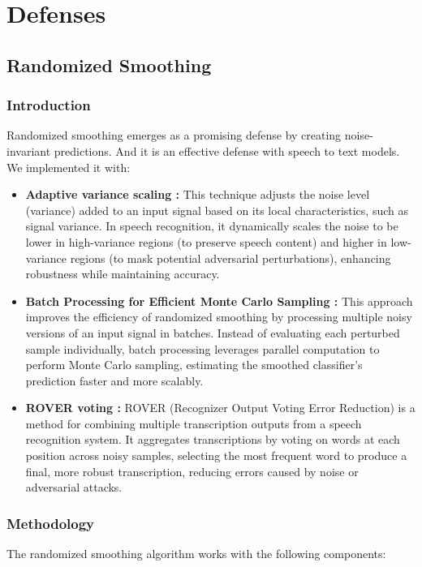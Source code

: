 \documentclass[../main.tex]{subfiles}
\begin{document}
\section{Defenses}
\subsection{Randomized Smoothing}
\subsubsection{Introduction}
Randomized smoothing \cite{cohen2019certified} emerges as a promising defense by creating noise-invariant predictions. And it is an effective defense with speech to text models\cite{zelasko2021adversarial}. We implemented it with:

\begin{itemize}
    \item \textbf{Adaptive variance scaling \cite{li2024adaptive}:} This technique adjusts the noise level (variance) added to an input signal based on its local characteristics, such as signal variance. In speech recognition, it dynamically scales the noise to be lower in high-variance regions (to preserve speech content) and higher in low-variance regions (to mask potential adversarial perturbations), enhancing robustness while maintaining accuracy.
    \item \textbf{Batch Processing for Efficient Monte Carlo Sampling \cite{cohen2019certified}:} This approach improves the efficiency of randomized smoothing by processing multiple noisy versions of an input signal in batches. Instead of evaluating each perturbed sample individually, batch processing leverages parallel computation to perform Monte Carlo sampling, estimating the smoothed classifier's prediction faster and more scalably. 
    \item \textbf{ROVER voting \cite{olivier2022sequential}:} ROVER (Recognizer Output Voting Error Reduction) is a method for combining multiple transcription outputs from a speech recognition system. It aggregates transcriptions by voting on words at each position across noisy samples, selecting the most frequent word to produce a final, more robust transcription, reducing errors caused by noise or adversarial attacks.
\end{itemize}


\subsubsection{Methodology}
The randomized smoothing algorithm works with the following components:
\end{document}
